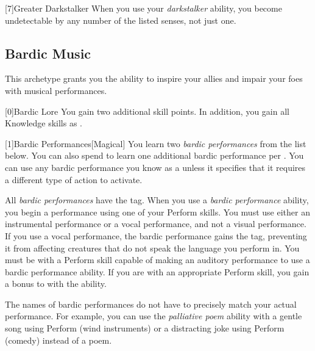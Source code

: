         [7]{Greater Darkstalker} When you use your \textit{darkstalker} ability, you become undetectable by any number of the listed senses, not just one.

    \newpage
    \subsection{Bardic Music}
        This archetype grants you the ability to inspire your allies and impair your foes with musical performances.

        [0]{Bardic Lore} You gain two additional skill points.
        In addition, you gain all Knowledge skills as .

        [1]{Bardic Performances}[Magical]
        You learn two \textit{bardic performances} from the list below.
        You can also spend  to learn one additional bardic performance per .
        You can use any bardic performance you know as a  unless it specifies that it requires a different type of action to activate.

        All \textit{bardic performances} have the  tag.
        When you use a \textit{bardic performance} ability, you begin a performance using one of your Perform skills.
        You must use either an instrumental performance or a vocal performance, and not a visual performance.
        If you use a vocal performance, the bardic performance gains the  tag, preventing it from affecting creatures that do not speak the language you perform in.
        You must be  with a Perform skill capable of making an auditory performance to use a bardic performance ability.
        If you are  with an appropriate Perform skill, you gain a  bonus to  with the ability.

        The names of bardic performances do not have to precisely match your actual performance.
        For example, you can use the \textit{palliative poem} ability with a gentle song using Perform (wind instruments) or a distracting joke using Perform (comedy) instead of a poem.

